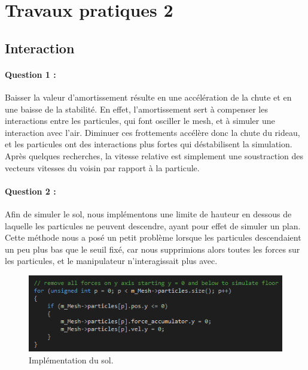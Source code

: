 \documentclass[a4paper,12pt]{article}
\begin{document}
\newpage\section{Travaux pratiques 2}

\subsection{Interaction}
\paragraph{Question 1 :} Baisser la valeur d'amortissement résulte en une accélération de la chute et en une baisse de la stabilité. En effet, l'amortissement sert à compenser les interactions entre les particules, qui font osciller le mesh, et à simuler une interaction avec l'air. Diminuer ces \og{}frottements\fg{} accélère donc la chute du rideau, et les particules ont des interactions plus fortes qui déstabilisent la simulation. Après quelques recherches, la vitesse relative est simplement une soustraction des vecteurs vitesses du voisin par rapport à la particule.

\paragraph{Question 2 :} Afin de simuler le sol, nous implémentons une limite de hauteur en dessous de laquelle les particules ne peuvent descendre, ayant pour effet de simuler un plan. Cette méthode nous a posé un petit problème lorsque les particules descendaient un peu plus bas que le seuil fixé, car nous supprimions alors toutes les forces sur les particules, et le manipulateur n’interagissait plus avec.
\begin{figure}[ht!]
  \centering
  \includegraphics[width=\textwidth]{images/sol_code.png}
  \caption{Implémentation du sol.}
  \label{fig:floor_code}
\end{figure}
\end{document}
